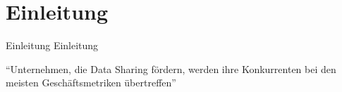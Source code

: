 
{
    \section{Einleitung}
}

\begin{frame}{Einleitung}
    Einleitung~\cite{mollerIndustrialDataEcosystems2024}

    \enquote{Unternehmen, die Data Sharing fördern, werden ihre Konkurrenten bei den meisten Geschäftsmetriken übertreffen}~\cite{mollerIndustrialDataEcosystems2024}
\end{frame}
